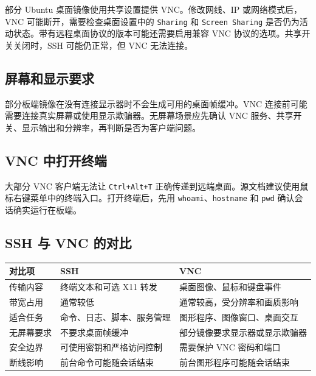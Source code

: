 部分 Ubuntu 桌面镜像使用共享设置提供 VNC。修改网线、IP 或网络模式后，VNC
可能断开，需要检查桌面设置中的 \passthrough{\lstinline!Sharing!} 和
\passthrough{\lstinline!Screen Sharing!}
是否仍为活动状态。带有远程桌面协议的版本可能还需要启用兼容 VNC
协议的选项。共享开关关闭时，SSH 可能仍正常，但 VNC 无法连接。

\subsection{屏幕和显示要求}\label{ux5c4fux5e55ux548cux663eux793aux8981ux6c42}

部分板端镜像在没有连接显示器时不会生成可用的桌面帧缓冲。VNC
连接前可能需要连接真实屏幕或使用显示欺骗器。无屏幕场景应先确认 VNC
服务、共享开关、显示输出和分辨率，再判断是否为客户端问题。

\subsection{VNC 中打开终端}\label{vnc-ux4e2dux6253ux5f00ux7ec8ux7aef}

大部分 VNC 客户端无法让 \passthrough{\lstinline!Ctrl+Alt+T!}
正确传递到远端桌面。源文档建议使用鼠标右键菜单中的终端入口。打开终端后，先用
\passthrough{\lstinline!whoami!}、\passthrough{\lstinline!hostname!} 和
\passthrough{\lstinline!pwd!} 确认会话确实运行在板端。

\subsection{SSH 与 VNC 的对比}\label{ssh-ux4e0e-vnc-ux7684ux5bf9ux6bd4}

\begin{longtable}[]{@{}lll@{}}
\toprule\noalign{}
对比项 & SSH & VNC \\
\midrule\noalign{}
\endhead
\bottomrule\noalign{}
\endlastfoot
传输内容 & 终端文本和可选 X11 转发 & 桌面图像、鼠标和键盘事件 \\
带宽占用 & 通常较低 & 通常较高，受分辨率和画质影响 \\
适合任务 & 命令、日志、脚本、服务管理 & 图形程序、图像窗口、桌面交互 \\
无屏幕要求 & 不要求桌面帧缓冲 & 部分镜像要求显示器或显示欺骗器 \\
安全边界 & 可使用密钥和严格访问控制 & 需要保护 VNC 密码和端口 \\
断线影响 & 前台命令可能随会话结束 & 前台图形程序可能随会话结束 \\
\end{longtable}


